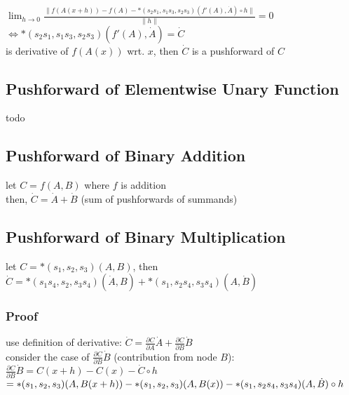 \documentclass[8pt]{extarticle}
\begin{document}
\begin{multicols*}{2}
  $\lim_{h \rightarrow 0} \frac{\| f(A(x+h)) - f(A) - *(s_2 s_1, s_1 s_3, s_2 s_3)(f'(A), \dot{A}) \circ h \|}{\|h\|} = 0$ \\
  $\iff *(s_2 s_1, s_1 s_3, s_2 s_3)(f'(A), \dot{A}) = \dot{C}$ \\
  is derivative of $f(A(x))$ wrt. $x$, then $\dot{C}$ is a pushforward of $C$
  
  \vfill\null
  \columnbreak

  \subsection{Pushforward of Elementwise Unary Function}
  todo

  \vfill\null
  \columnbreak

  \subsection{Pushforward of Binary Addition}
  let $C=f(A,B)$ where $f$ is addition\\
  then, $\dot{C}=\dot{A} + \dot{B}$ (sum of pushforwards of summands) 

  \vfill\null
  \columnbreak

  \subsection{Pushforward of Binary Multiplication}
  let $C=*(s_1,s_2,s_3)(A,B)$, then\\
  $\dot{C} = *(s_1 s_4, s_2, s_3 s_4)(\dot{A}, B) + *(s_1, s_2 s_4, s_3 s_4)(A, \dot{B})$

  \subsubsection{Proof}
  use definition of derivative: $\dot{C} = \frac{\partial C}{\partial A} \dot{A} + \frac{\partial C}{\partial B} \dot{B}$\\
  consider the case of $\frac{\partial C}{\partial B} \dot{B}$ (contribution from node $B$):\\

  $\frac{\partial C}{\partial B} \dot{B} = C(x+h) - C(x) - \dot{C} \circ h$\\
  $= *(s_1, s_2, s_3)(A, B(x+h))\\
  - *(s_1, s_2, s_3)(A, B(x))\\
  - *(s_1, s_2 s_4, s_3 s_4)(A, \dot{B}) \circ h$\\


\end{multicols*}
\end{document}
